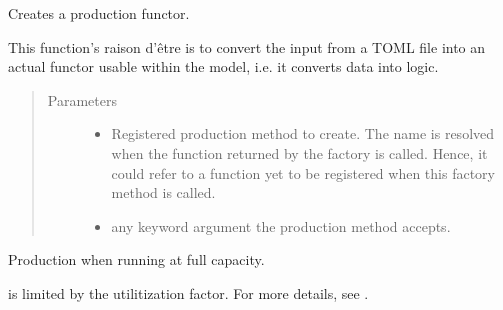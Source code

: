 \documentclass[letterpaper,10pt,english]{sphinxmanual}
\begin{document}
\begin{fulllineitems}
\label{\detokenize{api:muse.production.factory}}
Creates a production functor.

This function’s raison d’être is to convert the input from a TOML file into an
actual functor usable within the model, i.e. it converts data into logic.
\begin{quote}\begin{description}
\item[{Parameters}] \leavevmode\begin{itemize}
\item {} 
 \textendash{} Registered production method to create. The name is resolved when the
function returned by the factory is called. Hence, it could refer to a
function yet to be registered when this factory method is called.

\item {} 
 \textendash{} any keyword argument the production method accepts.

\end{itemize}

\end{description}\end{quote}

\end{fulllineitems}


\begin{fulllineitems}
\label{\detokenize{api:muse.production.maximum_production}}
Production when running at full capacity.

 is limited by the utilitization factor. For more details, see
.

\end{fulllineitems}
\end{document}
